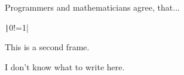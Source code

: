 \documentclass{beamer}
\begin{document}
\begin{frame}
  Programmers and mathematicians agree, that...
  \pause

  \texttt|0!=1|
\end{frame}

\begin{frame}
    This is a second frame.
    \pause

    I don't know what to write here.
\end{frame}
\end{document}
